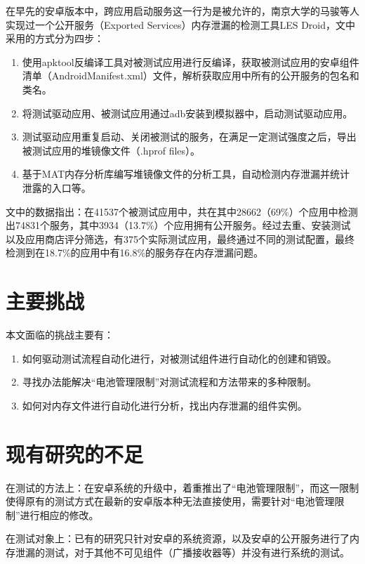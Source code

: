 在早先的安卓版本中，跨应用启动服务这一行为是被允许的，南京大学的马骏等人实现过一个公开服务（Exported Services）内存泄漏的检测工具LES Droid\cite{jun2018lesdroid}，文中采用的方式分为四步：

\begin{enumerate}
	\item 使用apktool反编译工具\cite{apktool}对被测试应用进行反编译，获取被测试应用的安卓组件清单（AndroidManifest.xml）文件，解析获取应用中所有的公开服务的包名和类名。
	\item 将测试驱动应用、被测试应用通过adb安装到模拟器中，启动测试驱动应用。
	\item 测试驱动应用重复启动、关闭被测试的服务，在满足一定测试强度之后，导出被测试应用的堆镜像文件（.hprof files）。
	\item 基于MAT内存分析库\cite{mat}编写堆镜像文件的分析工具，自动检测内存泄漏并统计泄露的入口等。
\end{enumerate}

\label{pre-result}
文中的数据指出：在41537个被测试应用中，共在其中28662（69\%）个应用中检测出74831个服务，其中3934（13.7\%）个应用拥有公开服务。经过去重、安装测试以及应用商店评分筛选，有375个实际测试应用，最终通过不同的测试配置，最终检测到在18.7\%的应用中有16.8\%的服务存在内存泄漏问题。

\section{主要挑战}

本文面临的挑战主要有：

\begin{enumerate}
	\item 如何驱动测试流程自动化进行，对被测试组件进行自动化的创建和销毁。
	\item 寻找办法能解决“电池管理限制”对测试流程和方法带来的多种限制。
	\item 如何对内存文件进行自动化进行分析，找出内存泄漏的组件实例。
\end{enumerate}

\section{现有研究的不足}

在测试的方法上：在安卓系统的升级中，着重推出了“电池管理限制”，而这一限制使得原有的测试方式在最新的安卓版本种无法直接使用，需要针对“电池管理限制”进行相应的修改。

在测试对象上：已有的研究只针对安卓的系统资源，以及安卓的公开服务进行了内存泄漏的测试，对于其他不可见组件（广播接收器等）并没有进行系统的测试。
